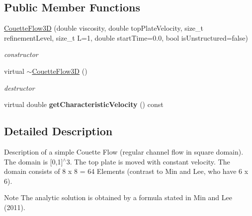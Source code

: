 \subsection*{Public Member Functions}
\begin{DoxyCompactItemize}
\item 
\hyperlink{classnatrium_1_1CouetteFlow3D_acf083268f4190ffe62b01f3dfc77d407}{CouetteFlow3D} (double viscosity, double topPlateVelocity, size\_\-t refinementLevel, size\_\-t L=1, double startTime=0.0, bool isUnstructured=false)
\begin{DoxyCompactList}\small\item\em constructor \item\end{DoxyCompactList}\item 
\hypertarget{classnatrium_1_1CouetteFlow3D_a2d1b9db247ba3e51ed092dab3637a657}{
virtual \hyperlink{classnatrium_1_1CouetteFlow3D_a2d1b9db247ba3e51ed092dab3637a657}{$\sim$CouetteFlow3D} ()}
\label{classnatrium_1_1CouetteFlow3D_a2d1b9db247ba3e51ed092dab3637a657}

\begin{DoxyCompactList}\small\item\em destructor \item\end{DoxyCompactList}\item 
\hypertarget{classnatrium_1_1CouetteFlow3D_a38cc986a0f45a5ec7ef56fefc9e342df}{
virtual double {\bfseries getCharacteristicVelocity} () const }
\label{classnatrium_1_1CouetteFlow3D_a38cc986a0f45a5ec7ef56fefc9e342df}

\end{DoxyCompactItemize}


\subsection{Detailed Description}
Description of a simple Couette Flow (regular channel flow in square domain). The domain is \mbox{[}0,1\mbox{]}$^\wedge$3. The top plate is moved with constant velocity. The domain consists of 8 x 8 = 64 Elements (contrast to Min and Lee, who have 6 x 6). \begin{DoxyNote}{Note}
The analytic solution is obtained by a formula stated in Min and Lee (2011). 
\end{DoxyNote}


